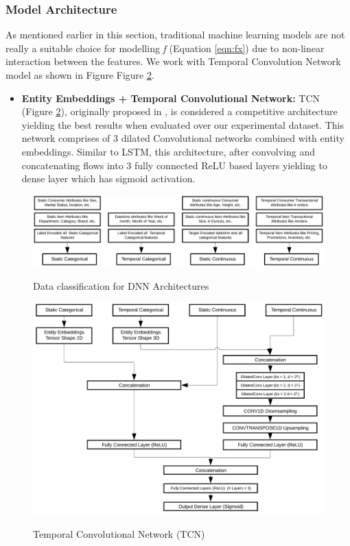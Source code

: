 \subsubsection{Model Architecture}
As mentioned earlier in this section, traditional machine learning models are not really a suitable choice for modelling \emph{f} 
(Equation \ref{eqn:fx}) due to non-linear interaction between the features.
We work with Temporal Convolution Network model as shown in Figure Figure \ref{fig:TCN}.
\begin{itemize}
\item {\bf Entity Embeddings + Temporal Convolutional Network:} TCN (Figure \ref{fig:TCN}), originally
proposed in \cite{lea2016temporal} , is considered a competitive architecture yielding the best results when evaluated over 
our experimental dataset. This network comprises of 3 dilated Convolutional networks combined with entity embeddings.
Similar to LSTM, this architecture, after convolving and concatenating flows into 
3 fully connected ReLU based layers yielding to dense layer which has sigmoid activation.
\end{itemize}
\begin{figure}[t]
    \centering 
    \caption{Data classification for DNN Architectures} 
    \includegraphics[width=5.5in]{img/dnndata.png} 
    \label{fig:dnndata} 
  \end{figure}
  \begin{figure}[t]
    \centering 
    \caption{Temporal Convolutional Network (TCN)} 
    \includegraphics[width=5.5in]{img/TCN.png} 
    \label{fig:TCN} 
  \end{figure}
